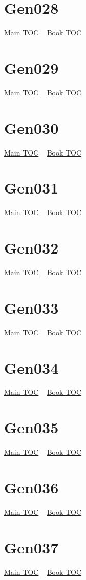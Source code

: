 \documentclass{book}
\begin{document}
  \section{Gen028}\hyperlink{toc}{Main TOC} ~ \hyperref[subsec:Gen]{Book TOC} 
  \section{Gen029}\hyperlink{toc}{Main TOC} ~ \hyperref[subsec:Gen]{Book TOC} 
  \section{Gen030}\hyperlink{toc}{Main TOC} ~ \hyperref[subsec:Gen]{Book TOC} 
  \section{Gen031}\hyperlink{toc}{Main TOC} ~ \hyperref[subsec:Gen]{Book TOC} 
  \section{Gen032}\hyperlink{toc}{Main TOC} ~ \hyperref[subsec:Gen]{Book TOC} 
  \section{Gen033}\hyperlink{toc}{Main TOC} ~ \hyperref[subsec:Gen]{Book TOC} 
  \section{Gen034}\hyperlink{toc}{Main TOC} ~ \hyperref[subsec:Gen]{Book TOC} 
  \section{Gen035}\hyperlink{toc}{Main TOC} ~ \hyperref[subsec:Gen]{Book TOC} 
  \section{Gen036}\hyperlink{toc}{Main TOC} ~ \hyperref[subsec:Gen]{Book TOC} 
  \section{Gen037}\hyperlink{toc}{Main TOC} ~ \hyperref[subsec:Gen]{Book TOC} 
\end{document}

